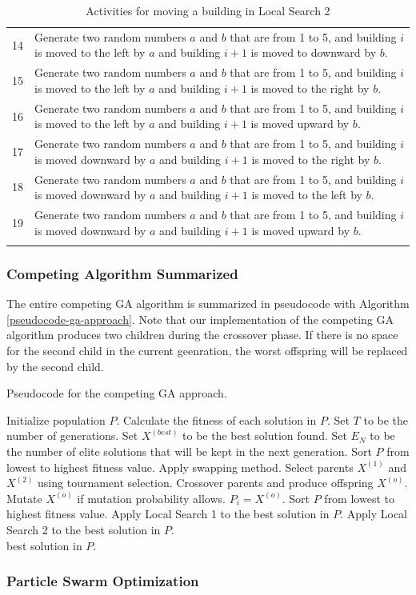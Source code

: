 \begin{longtable}{| c | p{120mm} |}
	14 & Generate two random numbers $a$ and $b$ that are from 1 to 5, and building $i$ is moved to the left by $a$ and building $i + 1$ is moved to downward by $b$. \\
	15 & Generate two random numbers $a$ and $b$ that are from 1 to 5, and building $i$ is moved to the left by $a$ and building $i + 1$ is moved to the right by $b$. \\
	16 & Generate two random numbers $a$ and $b$ that are from 1 to 5, and building $i$ is moved to the left by $a$ and building $i + 1$ is moved upward by $b$. \\
	17 & Generate two random numbers $a$ and $b$ that are from 1 to 5, and building $i$ is moved downward by $a$ and building $i + 1$ is moved to the right by $b$. \\
	18 & Generate two random numbers $a$ and $b$ that are from 1 to 5, and building $i$ is moved downward by $a$ and building $i + 1$ is moved to the left by $b$. \\
	19 & Generate two random numbers $a$ and $b$ that are from 1 to 5, and building $i$ is moved downward by $a$ and building $i + 1$ is moved upward by $b$. \\
	\hline
	\caption{Activities for moving a building in Local Search 2}
	\label{local-search-2-activities}
\end{longtable}

\subsubsection{Competing Algorithm Summarized}
The entire competing GA algorithm is summarized in pseudocode with Algorithm \ref{pseudocode-ga-approach}. Note that our implementation of the competing GA algorithm produces two children during the crossover phase. If there is no space for the second child in the current geenration, the worst offspring will be replaced by the second child.

\begin{algorithm}
\caption{Pseudocode for the competing GA approach.}
\label{pseudocode-ga-approach}
\begin{algorithmic}[1]
\State Initialize population $P$.
\State Calculate the fitness of each solution in $P$.
\State Set $T$ to be the number of generations.
\State Set $X^{(best)}$ to be the best solution found.
\State Set $E_{N}$ to be the number of elite solutions that will be kept in the next generation.
\State Sort $P$ from lowest to highest fitness value.
		\State Apply swapping method.
	\EndIf
		\State Select parents $X^{(1)}$ and $X^{(2)}$ using tournament selection.
		\State Crossover parents and produce offspring $X^{(o)}$.
		\State Mutate $X^{(o)}$ if mutation probability allows.
		\State $P_{i} = X^{(o)}$.
	\EndFor
	\State Sort $P$ from lowest to highest fitness value.
	\State Apply Local Search 1 to the best solution in $P$.
		\State Apply Local Search 2 to the best solution in $P$.
	\EndIf
\EndFor \\
\Return best solution in $P$.
\end{algorithmic}
\end{algorithm}

\subsubsection{Particle Swarm Optimization}